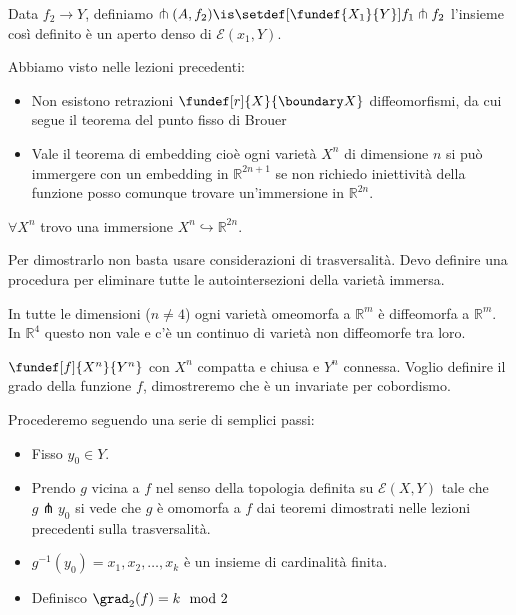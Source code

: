 \begin{teo}
Data $f_{2} \rightarrow Y$, definiamo $\pitchfork(A, f_{2}) \is \setdef[\fundef{X_{1}}{Y}] {f_{1} \pitchfork f_{2}}$ l'insieme così definito è un aperto denso di $\mathcal{E}(x_{1}, Y)$.
\end{teo}

Abbiamo visto nelle lezioni precedenti:

\begin{itemize}
 \item Non esistono retrazioni $\fundef[r]{X}{\boundary X}$ diffeomorfismi, da cui segue il teorema del punto fisso di Brouer
 \item Vale il teorema di embedding cioè ogni varietà $X^{n}$ di dimensione $n$ si può immergere con un embedding in $\mathbb{R}^{2n+1}$ se non richiedo iniettività della funzione 
 posso comunque trovare un'immersione in $\mathbb{R}^{2n}$. 
\end{itemize}

\begin{teo}  
$\forall X^{n}$ trovo una immersione $X^{n} \hookrightarrow \mathbb{R}^{2n}$.
\end{teo}

\begin{oss}
 Per dimostrarlo non basta usare considerazioni di trasversalità. Devo definire una procedura per eliminare tutte le autointersezioni della varietà immersa.
\end{oss}

\begin{oss} %
 In tutte le dimensioni ($n \neq 4$) ogni varietà omeomorfa a $\mathbb{R}^{m}$ è diffeomorfa a  $\mathbb{R}^{m}$. In $\mathbb{R}^{4}$ questo non vale e c'è un continuo di varietà 
 non diffeomorfe tra loro.
\end{oss}

$\fundef[f]{X^{n}}{Y^{n}}$ con $X^{n}$ compatta e chiusa e $Y^{n}$ connessa. Voglio definire il grado della funzione $f$, dimostreremo che è un invariate per cobordismo.

\begin{defn}

\end{defn}

\begin{defn}
Procederemo seguendo una serie di semplici passi:
\begin{itemize}
 \item Fisso $y_{0} \in Y$.
 \item Prendo $g$ vicina a $f$ nel senso della topologia definita su $\mathcal{E}(X, Y)$ tale che $g \pitchfork {y_{0}}$ si vede che $g$ è 
 omomorfa a $f$ dai teoremi dimostrati nelle lezioni precedenti sulla trasversalità.
 \item $g^{-1}(y_{0}) = {x_{1}, x_{2}, \dots, x_{k}}$ è un insieme di cardinalità finita.
 \item Definisco $\grad_{2}(f) = k \mod 2$
\end{itemize}
\end{defn}

